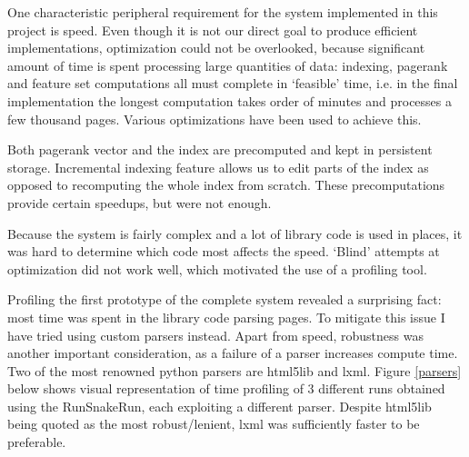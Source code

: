 \documentclass[12pt,twoside,notitlepage]{report}
\begin{document}
One characteristic peripheral requirement for the system implemented in this
project is speed.  Even though it is not our direct goal to produce efficient
implementations, optimization could not be overlooked, because significant amount of
time is spent processing large quantities of data: indexing, pagerank
and feature set computations all must complete in `feasible' time, i.e. in the
final implementation the longest computation takes order of minutes and
processes a few thousand pages. Various optimizations have been used to achieve
this.

Both pagerank vector and the index are precomputed and kept in persistent
storage. Incremental indexing feature allows us to edit parts of the index as
opposed to recomputing the whole index from scratch. These precomputations
provide certain speedups, but were not enough.

Because the system is fairly complex and a lot of library code is used in
places, it was hard to determine which code most affects the speed. `Blind'
attempts at optimization did not work well, which motivated the use of a
profiling tool.

Profiling the first prototype of the complete system revealed a surprising
fact: most time was spent in the library code parsing pages. To mitigate this
issue I have tried using custom parsers instead. Apart from speed, robustness
was another important consideration, as a failure of a parser increases compute
time. Two of the most renowned python parsers are html5lib and lxml. 
Figure \ref{parsers} below shows visual representation of time profiling
of 3 different runs obtained using the RunSnakeRun, each exploiting a
different parser. 
Despite html5lib being quoted as the most robust/lenient, lxml was sufficiently
faster to be preferable.
\end{document}
